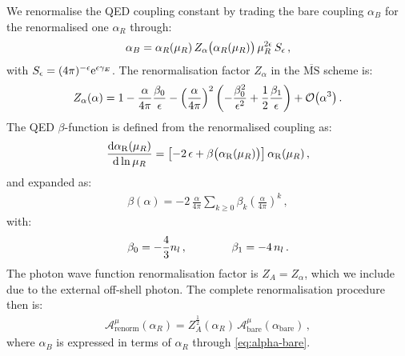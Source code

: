 \documentclass[main.tex]{subfiles}
\begin{document}
We renormalise the QED coupling constant by trading the bare coupling $\alpha_B$ for the renormalised one $\alpha_R$ through:
\begin{align}
    \label{eq:alpha-bare}
    \alpha_B = \alpha_R(\mu_R) \, Z_{\alpha}\bigl(\alpha_R(\mu_R) \bigr)  \, \mu_R^{2 \epsilon} \, S_{\epsilon} \,,
\end{align}
with $S_\epsilon=(4\pi)^{-\epsilon} \mathrm{e}^{\epsilon\gamma_E}$.
The renormalisation factor $Z_{\alpha}$ in the $\overline{\text{MS}}$ scheme is: \cite{Barnreuther:2013qvf,Bonciani:2021okt}
\begin{align}
    \label{eq:Za}
    Z_{\alpha}(\alpha) = 1 - \frac{\alpha}{4 \pi} \frac{\beta_0}{\epsilon} -
    \left(\frac{\alpha}{4 \pi}\right)^2 \left( -\frac{\beta_0^2}{\epsilon^2} + \frac{1}{2}\frac{\beta_1}{\epsilon} \right) + \mathcal{O}\bigl(\alpha^3\bigr) \,.
\end{align}
The QED $\beta$-function is defined from the renormalised coupling as:
\begin{align} \label{eq:beta_func_def}
\frac{\mathrm{d} \alpha_{\rm R}(\mu_R)}{\mathrm{d} \ln \mu_R} = \left[ -2 \, \epsilon + \beta\bigl(\alpha_{\rm R}(\mu_R)\bigr) \right]  \alpha_{\rm R}(\mu_R) \,,
\end{align}
and expanded as:
\begin{align} \label{eq:beta_func}
\beta( \alpha ) = -2 \, \frac{\alpha}{4 \pi}  \sum_{k\ge 0} \beta_k \left(\frac{\alpha}{4\pi} \right)^k \,,
\end{align}
with:
\begin{align} \label{eq:beta_coeffs}
\beta_0 = -\frac{4}{3} n_l \,, \qquad \qquad \beta_1 = - 4 \, n_l \,.
\end{align}
The photon wave function renormalisation factor is $Z_A=Z_\alpha$, which we include due to the external off-shell photon. The complete renormalisation procedure then is:
\begin{align}
    \mathcal{A}^\mu_\text{renorm}(\alpha_R) = Z_A^{\frac{1}{2}}(\alpha_R) \, \mathcal{A}^\mu_\text{bare}(\alpha_\text{bare}) \, ,
\end{align}
where $\alpha_B$ is expressed in terms of $\alpha_R$ through \cref{eq:alpha-bare}.
\end{document}
